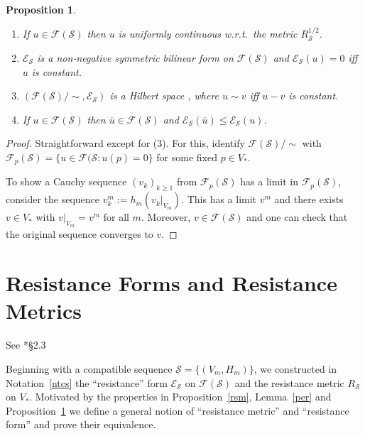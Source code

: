 \documentclass[a4paper]{amsart}
\theoremstyle{plain}
\newtheorem{proposition}[theorem]{Proposition}
\theoremstyle{definition}
\theoremstyle{remark}
\begin{document}
\begin{proposition} \label{prrs}\mbox{} 
\begin{enumerate}
 \item If $ u \in \mathcal{F} ( \mathcal{S} ) $ then $ u $ is uniformly continuous w.r.t.\ the metric $ R_ { \mathcal{S} } ^ {1/2} $.
\item $ \mathcal{E} _ { \mathcal{S} } $ is a non-negative symmetric bilinear form on $ \mathcal{F} ( \mathcal{S} ) $ and $ \mathcal{E} _ { \mathcal{S} }(u) = 0 $ iff $ u $ is constant.
\item $ ( \mathcal{F} ( \mathcal{S} ) /\!\! \sim , \mathcal{E} _ { \mathcal{S} } ) $ is a Hilbert space , where $ u \sim v $ iff $ u - v $ is constant.
\item If $ u \in \mathcal{F} ( \mathcal{S} ) $ then $ \overline{u} \in \mathcal{F} ( \mathcal{S} ) $ and $ \mathcal{E} _ { \mathcal{S} }(\overline{u}) \leq \mathcal{E} _ { \mathcal{S} }(u)$.
\end{enumerate} 
\end{proposition} 

\begin{proof} Straightforward except for (3).  For this, identify $  \mathcal{F} ( \mathcal{S} ) /\!\! \sim $ with  $  \mathcal{F}_p ( \mathcal{S} ) 
= \{ u \in  \mathcal{F} ( \mathcal{S} : u(p) = 0 \} $ for some fixed $ p \in V_* $.

To show a Cauchy sequence $ (v_k)_{k\geq 1} $ from $   \mathcal{F}_p ( \mathcal{S} ) $ has a limit in $  \mathcal{F}_p ( \mathcal{S} ) $, consider the sequence $ v_k^m := h_m(v_k|_{V_m}) $.  This has a limit $   v^m $  and there exists $ v \in V_* $ with   $v|_{V_m} = v^ m $ for all $ m $. Moreover, $ v \in \mathcal{F} ( \mathcal{S} ) $ and one can check that the original sequence converges to $ v $.
\end{proof} 



\section{\textbf{Resistance Forms and Resistance Metrics}}

See \cite{Kig}*{\S 2.3}

\bigskip
Beginning with a compatible sequence $ \mathcal{S} = \{(V_m,H_m)\} $, we constructed in Notation~\ref{ntcs}   the ``resistance''  form   $ \mathcal{E} _ { \mathcal{S}} $ on $ \mathcal{F} ( \mathcal{S} ) $ and the resistance metric $ R_ { \mathcal{S} } $ on $ V_* $.  Motivated by the properties in Proposition~\ref{rsm}, Lemma~\ref{per} and Proposition~\ref{prrs} we define a general notion of ``resistance metric'' and ``resistance form'' and prove their equivalence.
\end{document}
